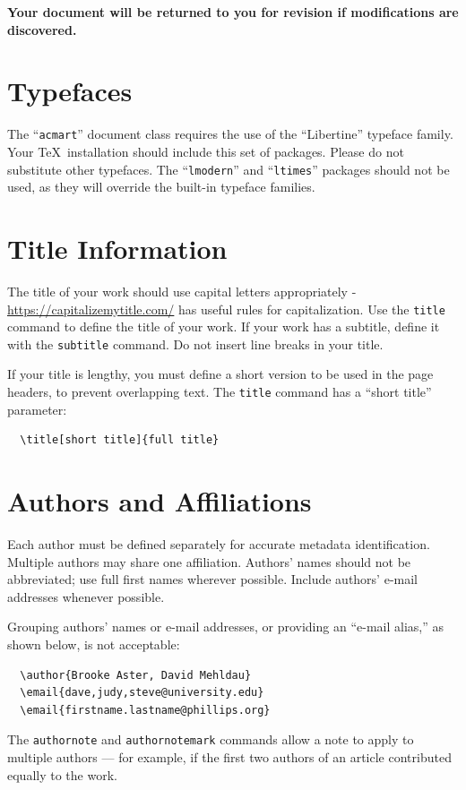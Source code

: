 \documentclass[sigconf]{acmart}
\begin{document}
{\bf Your document will be returned to you for revision if modifications are discovered.}

\section{Typefaces}

The ``\verb|acmart|'' document class requires the use of the ``Libertine'' typeface family. Your \TeX\ installation should include this set of packages. Please do not substitute other typefaces. The ``\verb|lmodern|'' and ``\verb|ltimes|'' packages should not be used, as they will override the built-in typeface families.

\section{Title Information}

The title of your work should use capital letters appropriately - \url{https://capitalizemytitle.com/} has useful rules for capitalization. Use the {\verb|title|} command to define the title of your work. If your work has a subtitle, define it with the {\verb|subtitle|} command.
Do not insert line breaks in your title.

If your title is lengthy, you must define a short version to be used in the page headers, to prevent overlapping text. The \verb|title| command has a ``short title'' parameter:
\begin{verbatim}
  \title[short title]{full title}
\end{verbatim}

\section{Authors and Affiliations}

Each author must be defined separately for accurate metadata identification. Multiple authors may share one affiliation. Authors' names should not be abbreviated; use full first names wherever possible. Include authors' e-mail addresses whenever possible.

Grouping authors' names or e-mail addresses, or providing an ``e-mail alias,'' as shown below, is not acceptable:
\begin{verbatim}
  \author{Brooke Aster, David Mehldau}
  \email{dave,judy,steve@university.edu}
  \email{firstname.lastname@phillips.org}
\end{verbatim}

The \verb|authornote| and \verb|authornotemark| commands allow a note to apply to multiple authors --- for example, if the first two authors of an article contributed equally to the work. 
\end{document}
